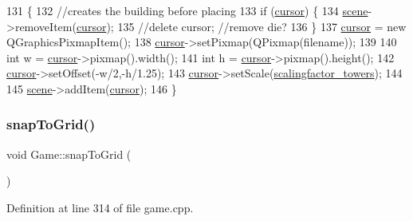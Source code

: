 \begin{DoxyCode}
131 \{
132     \textcolor{comment}{//creates the building before placing}
133     \textcolor{keywordflow}{if} (\hyperlink{class_game_ac8bde3bd16f503846f66bbb866c3b7b9}{cursor}) \{
134         \hyperlink{class_game_a8119e3b9a632906c6808fa294b46a92a}{scene}->removeItem(\hyperlink{class_game_ac8bde3bd16f503846f66bbb866c3b7b9}{cursor});
135         \textcolor{comment}{//delete cursor; //remove die?}
136     \}
137     \hyperlink{class_game_ac8bde3bd16f503846f66bbb866c3b7b9}{cursor} = \textcolor{keyword}{new} QGraphicsPixmapItem();
138     \hyperlink{class_game_ac8bde3bd16f503846f66bbb866c3b7b9}{cursor}->setPixmap(QPixmap(filename));
139 
140     \textcolor{keywordtype}{int} w = \hyperlink{class_game_ac8bde3bd16f503846f66bbb866c3b7b9}{cursor}->pixmap().width();
141     \textcolor{keywordtype}{int} h = \hyperlink{class_game_ac8bde3bd16f503846f66bbb866c3b7b9}{cursor}->pixmap().height();
142     \hyperlink{class_game_ac8bde3bd16f503846f66bbb866c3b7b9}{cursor}->setOffset(-w/2,-h/1.25);
143     \hyperlink{class_game_ac8bde3bd16f503846f66bbb866c3b7b9}{cursor}->setScale(\hyperlink{class_game_a6c1ca48f17f6934432d01bfa7f762a04}{scalingfactor\_towers});
144 
145     \hyperlink{class_game_a8119e3b9a632906c6808fa294b46a92a}{scene}->addItem(\hyperlink{class_game_ac8bde3bd16f503846f66bbb866c3b7b9}{cursor});
146 \}
\end{DoxyCode}
\mbox{\label{class_game_a4e2cc66ce5004779048a6d8de19f0cdc}} 
\subsubsection{\texorpdfstring{snap\+To\+Grid()}{snapToGrid()}}
{\footnotesize\ttfamily void Game\+::snap\+To\+Grid (\begin{DoxyParamCaption}{ }\end{DoxyParamCaption})}



Definition at line 314 of file game.\+cpp.


